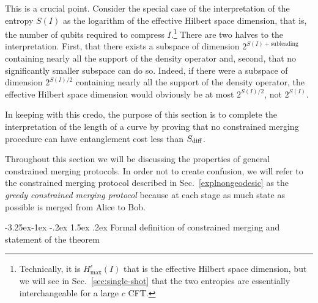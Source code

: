 \documentclass[12pt]{article}
\makeatletter
\renewcommand\subsection{\@startsection{subsection}{2}{\z@}%
                                     {-3.25ex\@plus -1ex \@minus -.2ex}%
                                     {1.5ex \@plus .2ex}%
                                     {\normalfont\bfseries}}
\def\sdiff{S_{\rm diff}}
\newcommand{\Hmax}{H_{\max}}
\newcommand{\secref}[1]{Sec.~\ref{#1}}
\makeatother
\begin{document}
This is a crucial point. Consider the special case of the interpretation of the entropy $S(I)$ as the logarithm of the effective Hilbert space dimension, that is, the number of qubits required to compress $I$.\footnote{Technically, it is $\Hmax^\epsilon(I)$ that is the effective Hilbert space dimension, but we will see in Sec.~\ref{sec:single-shot} that the two entropies are essentially interchangeable for a large $c$ CFT.} There are two halves to the interpretation. First, that there exists a subspace of dimension $2^{S(I) + \text{subleading}}$ containing nearly all the support of the density operator and, second, that no significantly smaller subspace can do so. Indeed, if there were a subspace of dimension $2^{S(I)/2}$ containing nearly all the support of the density operator, the effective Hilbert space dimension would obviously be at most $2^{S(I)/2}$, not $2^{S(I)}$.

In keeping with this credo, the purpose of this section is to complete the interpretation of the length of a curve by proving that no constrained merging procedure can have entanglement cost less than $\sdiff$.

Throughout this section we will be discussing the properties of general constrained merging protocols. In order not to create confusion, we will refer to the constrained merging protocol described in \secref{explnongeodesic} as the \emph{greedy constrained merging protocol} because at each stage as much state as possible is merged from Alice to Bob.

\subsection{Formal definition of constrained merging and statement of the theorem}
\end{document}
